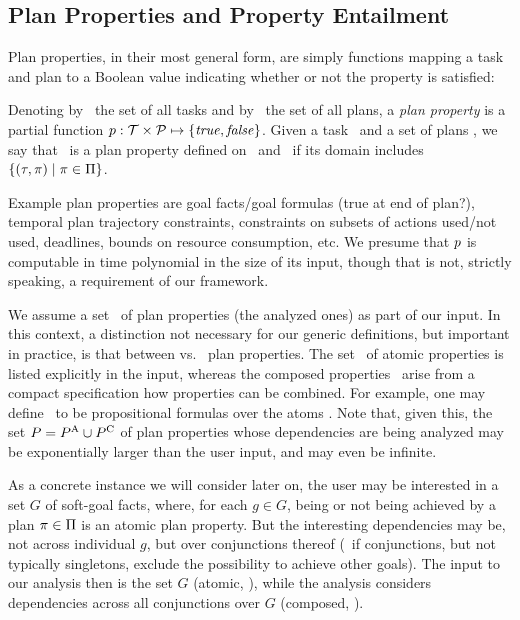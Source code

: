 \subsection{Plan Properties and Property Entailment}

Plan properties, in their most general form, are simply functions
mapping a task and plan to a Boolean value indicating whether or not
the property is satisfied:

\begin{definition}
Denoting by \alltasks\ the set of all tasks and by \allplans\ the set
of all plans, a \emph{plan property} is a partial function $p :
\cal T \times \cal P \mapsto \{\mathit{true}, \mathit{false}\}$. Given a task
\task\ and a set of plans \plans, we say that \prop\ is a plan
property defined on \task\ and \plans\ if its domain includes
$\{(\tau,\pi) \mid \pi \in \Pi\}$.
\end{definition}

Example plan properties are goal facts/goal formulas (true at end of
plan?), temporal plan trajectory constraints, constraints on subsets
of actions used/not used, deadlines, bounds on resource consumption,
etc. We presume that $p$ is computable in time polynomial in the
size of its input, though that is not, strictly speaking, a
requirement of our framework.

We assume a set \props\ of plan properties (the analyzed ones) as part
of our input. In this context, a distinction not necessary for our
generic definitions, but important in practice, is that between
 vs.\  plan properties. The set
\propsatom\ of atomic properties is listed explicitly in the input,
whereas the composed properties \propscomp\ arise from a compact
specification how properties can be combined. For example, one may
define \propscomp\ to be propositional formulas over the atoms
\propsatom. Note that, given this, the set $P = {P^{\text{\textup{A}}}} \cup
{P^{\text{\textup{C}}}}$ of plan properties whose dependencies are being analyzed
may be exponentially larger than the user input, and may even be
infinite.

As a concrete instance we will consider later on, the user may be
interested in a set $G$ of soft-goal facts, where, for each $g \in G$,
being or not being achieved by a plan $\pi \in \Pi$ is an atomic
plan property. But the interesting dependencies may be, not across
individual $g$, but over conjunctions thereof (\eg\ if conjunctions,
but not typically singletons, exclude the possibility to achieve other
goals). The input to our analysis then is the set $G$ (atomic,
\propsatom), while the analysis considers dependencies across all
conjunctions over $G$ (composed, \propscomp).

